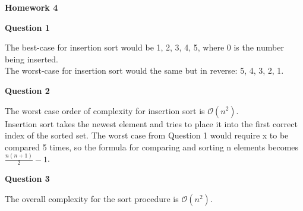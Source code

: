 \documentclass[11pt]{article}
\begin{document}
\center\textbf{Homework 4}
\begin{flushleft}

\textbf{Question 1}

The best-case for insertion sort would be 1, 2, 3, 4, 5, where 0 is the number being inserted. \\
The worst-case for insertion sort would the same but in reverse: 5, 4, 3, 2, 1.

\textbf{Question 2}

The worst case order of complexity for insertion sort is $\mathcal{O}(n^2)$.\\

Insertion sort takes the newest element and tries to place it into the first correct index of the sorted set. The worst case from Question 1 would require x to be compared 5 times, so the formula for comparing and sorting n elements becomes $\frac{n(n+1)}{2} - 1$.

\bigskip

\textbf{Question 3}

The overall complexity for the sort procedure is $\mathcal{O}(n^2)$.
\end{flushleft}
\end{document}

